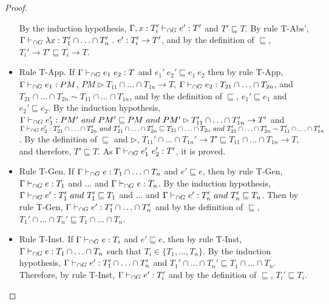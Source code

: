 \documentclass[a4paper]{article}
\begin{document}
\begin{proof}
\begin{itemize}
    By the induction hypothesis, $\Gamma, x : T_i' \vdash_{\cap G} e' : T'$ and $T' \sqsubseteq T$.
    By rule T-Abs', $\Gamma \vdash_{\cap G} \lambda x : T_1' \cap \ldots \cap T_n'\ .\ e' : T_i' \rightarrow T'$, and by the definition of $\sqsubseteq$, $T_i' \rightarrow T' \sqsubseteq T_i \rightarrow T$.
    \item Rule T-App.
    If $\Gamma \vdash_{\cap G} e_1\ e_2 : T$ and $e_1'\ e_2' \sqsubseteq e_1\ e_2$ then by rule T-App, $\Gamma \vdash_{\cap G} e_1 : PM$, $PM \rhd T_{11} \cap \ldots \cap T_{1n} \rightarrow T$, $\Gamma \vdash_{\cap G} e_2 : T_{21} \cap \ldots \cap T_{2n}$, and $T_{21} \cap \ldots \cap T_{2n} \sim T_{11} \cap \ldots \cap T_{1n}$, and by the definition of $\sqsubseteq$, $e_1' \sqsubseteq e_1$ and $e_2' \sqsubseteq e_2$.
    By the induction hypothesis, $\Gamma \vdash_{\cap G} e_1' : PM'\ and\ PM' \sqsubseteq PM\ and\ PM' \rhd T_{11}' \cap \ldots \cap T_{1n}' \rightarrow T'$ and $\Gamma \vdash_{\cap G} e_2' : T_{21}' \cap \ldots \cap T_{2n}'\ and\ T_{21}' \cap \ldots \cap T_{2n}' \sqsubseteq T_{21} \cap \ldots \cap T_{2n}\ and\ T_{21}' \cap \ldots \cap T_{2n}' \sim T_{11}' \cap \ldots \cap T_{1n}'$.
    By the definition of $\sqsubseteq$ and $\rhd$, $T_{11}' \cap \ldots \cap T_{1n}' \rightarrow T' \sqsubseteq T_{11} \cap \ldots \cap T_{1n} \rightarrow T$, and therefore, $T' \sqsubseteq T$.
    As $\Gamma \vdash_{\cap G} e_1'\ e_2' : T'$, it is proved.
    \item Rule T-Gen.
    If $\Gamma \vdash_{\cap G} e : T_1 \cap \ldots \cap T_n$ and $e' \sqsubseteq e$, then by rule T-Gen, $\Gamma \vdash_{\cap G} e : T_1$ and ... and $\Gamma \vdash_{\cap G} e : T_n$.
    By the induction hypothesis, $\Gamma \vdash_{\cap G} e' : T_1'\ and\ T_1' \sqsubseteq T_1$ and ... and $\Gamma \vdash_{\cap G} e' : T_n'\ and\ T_n' \sqsubseteq T_n$.
    Then by rule T-Gen, $\Gamma \vdash_{\cap G} e' : T_1' \cap \ldots \cap T_n'$ and by the definition of $\sqsubseteq$, $T_1' \cap \ldots \cap T_n' \sqsubseteq T_1 \cap \ldots \cap T_n$.
    \item Rule T-Inst.
    If $\Gamma \vdash_{\cap G} e : T_i$ and $e' \sqsubseteq e$, then by rule T-Inst, $\Gamma \vdash_{\cap G} e : T_1 \cap \ldots \cap T_n$ such that $T_i \in \{T_1, ..., T_n\}$.
    By the induction hypothesis, $\Gamma \vdash_{\cap G} e' : T_1' \cap \ldots \cap T_n'$ and $T_1' \cap \ldots \cap T_n' \sqsubseteq T_1 \cap \ldots \cap T_n$.
    Therefore, by rule T-Inst, $\Gamma \vdash_{\cap G} e' : T_i'$ and by the definition of $\sqsubseteq$, $T_i' \sqsubseteq T_i$.
\end{itemize}
\end{proof}
\end{document}
